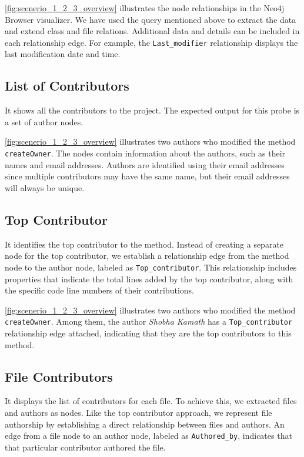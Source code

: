 \autoref{fig:scenerio_1_2_3_overview} illustrates the node relationships in the Neo4j Browser visualizer. We have used the query mentioned above to extract the data and extend class and file relations. Additional data and details can be included in each relationship edge. For example, the \texttt{Last\_modifier} relationship displays the last modification date and time.

\subsection{List of Contributors}
It shows all the contributors to the project. The expected output for this probe is a set of author nodes.

\autoref{fig:scenerio_1_2_3_overview} illustrates two authors who modified the method \texttt{createOwner}. The nodes contain information about the authors, such as their names and email addresses. Authors are identified using their email addresses since multiple contributors may have the same name, but their email addresses will always be unique.

\subsection{Top Contributor}
It identifies the top contributor to the method. Instead of creating a separate node for the top contributor, we establish a relationship edge from the method node to the author node, labeled as \texttt{Top\_contributor}. This relationship includes properties that indicate the total lines added by the top contributor, along with the specific code line numbers of their contributions.

\autoref{fig:scenerio_1_2_3_overview} illustrates two authors who modified the method \texttt{createOwner}. Among them, the author \textit{Shobha Kamath} has a \texttt{Top\_contributor} relationship edge attached, indicating that they are the top contributors to this method.

\subsection{File Contributors}
It displays the list of contributors for each file. To achieve this, we extracted files and authors as nodes. Like the top contributor approach, we represent file authorship by establishing a direct relationship between files and authors. An edge from a file node to an author node, labeled as \texttt{Authored\_by}, indicates that that particular contributor authored the file.

